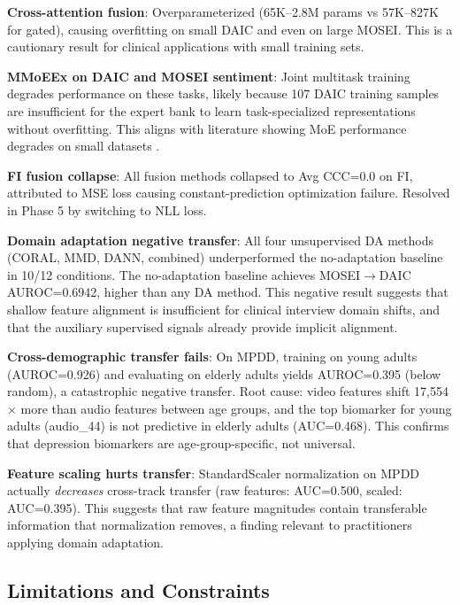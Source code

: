 \documentclass[12pt,oneside]{book}
\begin{document}
\begin{itemize}
\textbf{Cross-attention fusion}: Overparameterized (65K--2.8M params vs 57K--827K for gated), causing overfitting on small DAIC and even on large MOSEI. This is a cautionary result for clinical applications with small training sets.

\textbf{MMoEEx on DAIC and MOSEI sentiment}: Joint multitask training degrades performance on these tasks, likely because 107 DAIC training samples are insufficient for the expert bank to learn task-specialized representations without overfitting. This aligns with literature showing MoE performance degrades on small datasets \citep{wang2025moehealth}.

\textbf{FI fusion collapse}: All fusion methods collapsed to Avg CCC=0.0 on FI, attributed to MSE loss causing constant-prediction optimization failure. Resolved in Phase 5 by switching to NLL loss.

\textbf{Domain adaptation negative transfer}: All four unsupervised DA methods (CORAL, MMD, DANN, combined) underperformed the no-adaptation baseline in 10/12 conditions. The no-adaptation baseline achieves MOSEI$\to$DAIC AUROC=0.6942, higher than any DA method. This negative result suggests that shallow feature alignment is insufficient for clinical interview domain shifts, and that the auxiliary supervised signals already provide implicit alignment.

\textbf{Cross-demographic transfer fails}: On MPDD, training on young adults (AUROC=0.926) and evaluating on elderly adults yields AUROC=0.395 (below random), a catastrophic negative transfer. Root cause: video features shift 17,554$\times$ more than audio features between age groups, and the top biomarker for young adults (audio\_44) is not predictive in elderly adults (AUC=0.468). This confirms that depression biomarkers are age-group-specific, not universal.

\textbf{Feature scaling hurts transfer}: StandardScaler normalization on MPDD actually \emph{decreases} cross-track transfer (raw features: AUC=0.500, scaled: AUC=0.395). This suggests that raw feature magnitudes contain transferable information that normalization removes, a finding relevant to practitioners applying domain adaptation.

\subsection{Limitations and Constraints}


\end{itemize}
\end{document}
